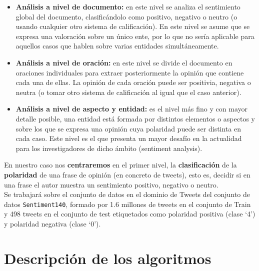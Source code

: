 \documentclass[a4paper,12pt]{report}
\begin{document}
\begin{itemize}
\item \textbf{Análisis a nivel de documento:} en este nivel se analiza el sentimiento global del documento, clasificándolo como positivo, negativo o neutro (o usando cualquier otro sistema de calificación). En este nivel se asume que se expresa una valoración sobre un único ente, por lo que no sería aplicable para aquellos casos que hablen sobre varias entidades simultáneamente.  

\item \textbf{Análisis a nivel de oración:} en este nivel se divide el documento en oraciones individuales para extraer posteriormente la opinión que contiene cada una de ellas. La opinión de cada oración puede ser positivia, negativa o neutra (o tomar otro sistema de calificación al igual que el caso anterior). 

\item \textbf{Análisis a nivel de aspecto y entidad:} es el nivel más fino y con mayor detalle posible, una entidad está formada por distintos elementos o aspectos y sobre los que se expresa una opinión cuya polaridad puede ser distinta en cada caso. Este nivel es el que presenta un mayor desafío en la actualidad para los investigadores de dicho ámbito (sentiment analysis). 

\end{itemize}
\vspace{2mm}

{\setlength{\parindent}{0cm}
En nuestro caso nos \textbf{centraremos} en el primer nivel,  la \textbf{clasificación} de la \textbf{polaridad} de una frase de opinión (en concreto de tweets), esto es, decidir si en una frase el autor muestra un sentimiento positivo, negativo o neutro.}
\vspace{2mm}\\
Se trabajará sobre el
conjunto de datos en el dominio de Tweets del conjunto de datos \texttt{Sentiment140}, formado por
1.6 millones de tweets en el conjunto de Train y 498 tweets en el conjunto de test etiquetados
como polaridad positiva (clase ‘4’) y polaridad negativa (clase ‘0’). 







\chapter{Descripción de los algoritmos}
\end{document}
